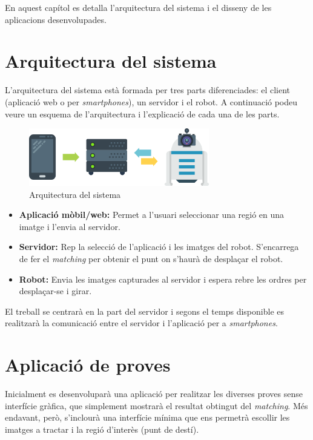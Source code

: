 \label{sec:Disseny}

En aquest capítol es detalla l'arquitectura del sistema i el disseny de les aplicacions desenvolupades.
\section{Arquitectura del sistema}
	L'arquitectura del sistema està formada per tres parts diferenciades: el client (aplicació web o per \textit{smartphones}), un servidor i el robot. A continuació podeu veure un esquema de l'arquitectura i l'explicació
	de cada una de les parts.\\
	\begin{figure}[H]
		\centering
		\includegraphics[width=0.7\textwidth]{images/arquitectura}
		\caption{Arquitectura del sistema}
	\end{figure}
	\vspace{0.05cm}
	\begin{itemize}
		\item{\textbf{Aplicació mòbil/web:} Permet a l'usuari seleccionar una regió en una imatge i l'envia al servidor.}
		\item{\textbf{Servidor:} Rep la selecció de l'aplicació i les imatges del robot. S'encarrega de fer el \textit{matching} per obtenir el punt on s'haurà de desplaçar el robot.}
		\item{\textbf{Robot:} Envia les imatges capturades al servidor i espera rebre les ordres per desplaçar-se i girar.\\}
	\end{itemize}
	El treball se centrarà en la part del servidor i segons el temps disponible es realitzarà la comunicació entre el servidor i l'aplicació per a \textit{smartphones}.

\section{Aplicació de proves}
	Inicialment es desenvoluparà una aplicació per realitzar les diverses proves sense interfície gràfica, que simplement mostrarà el resultat obtingut del \textit{matching}. Més endavant, però, s'inclourà una
	interfície mínima que ens permetrà escollir les imatges a tractar i la regió d'interès (punt de destí).
